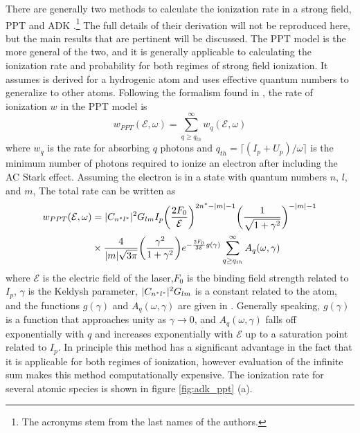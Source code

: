 There are generally two methods to calculate the ionization rate in a strong field, PPT \cite{perelomovIonizationAtomsAlternating1986} and ADK \cite{ammosovTunnelIonizationComplex1966}.\footnote{The acronyms stem from the last names of the authors.}  The full details of their derivation will not be reproduced here, but the main results that are pertinent will be discussed.  The PPT model is the more general of the two, and it is generally applicable to calculating the ionization rate and probability for both regimes of strong field ionization. It assumes is derived for a hydrogenic atom and uses effective quantum numbers to generalize to other atoms.  Following the formalism found in \cite{changFundamentalsAttosecondOptics2011}, the rate of ionization $w$ in the PPT model is  
\begin{equation}
	w_{PPT}(\mathcal{E},\omega)=\sum_{q\geq q_{th}}^{\infty}w_q(\mathcal{E},\omega)
\end{equation}
where $w_q$ is the rate for absorbing $q$ photons and $q_{th}=\lceil (I_p + U_p)/\omega \rceil$ is the minimum number of photons required to ionize an electron after including the AC Stark effect.  Assuming the electron is in a state with quantum numbers $n$, $l$, and $m$, The total rate can be written as
\begin{equation}
\label{eqn:PPT_arte}
\begin{aligned}
	w_{PPT}(\mathcal{E},\omega)&=\lvert C_{n^*l^*} \rvert^2 G_{lm} I_p \bigg( \frac{2F_0}{\mathcal{E}} \bigg) ^{2n^*-\lvert m \rvert -1}\bigg(\frac{1}{\sqrt{1+\gamma^2}}\bigg)^{-\lvert m \rvert -1}\\
	&\times \frac{4}{\lvert m \rvert \sqrt{3\pi}}\bigg(\frac{\gamma^2}{1+\gamma^2}\bigg)e^{-\frac{2F_0}{3\mathcal{E}}g(\gamma)}\sum_{q\geq q_{th}}^{\infty}A_q(\omega,\gamma)
\end{aligned}
\end{equation}
where $\mathcal{E}$ is the electric field of the laser,$F_0$ is the binding field strength related to $I_p$, $\gamma$ is the Keldysh parameter, $\lvert C_{n^*l^*} \rvert^2 G_{lm}$ is a constant related to the atom, and the functions $g(\gamma)$ and $A_q(\omega,\gamma)$ are given in \cite{changFundamentalsAttosecondOptics2011}.  Generally speaking, $g(\gamma)$ is a function that approaches unity as $\gamma\rightarrow0$, and $A_q(\omega,\gamma)$  falls off exponentially with $q$ and increases exponentially with $\mathcal{E}$ up to a saturation point related to $I_p$.  In principle this method has a significant advantage in the fact that it is applicable for both regimes of ionization, however evaluation of the infinite sum makes this method computationally expensive. The ionization rate for several atomic species is shown in figure \ref{fig:adk_ppt} (a).

